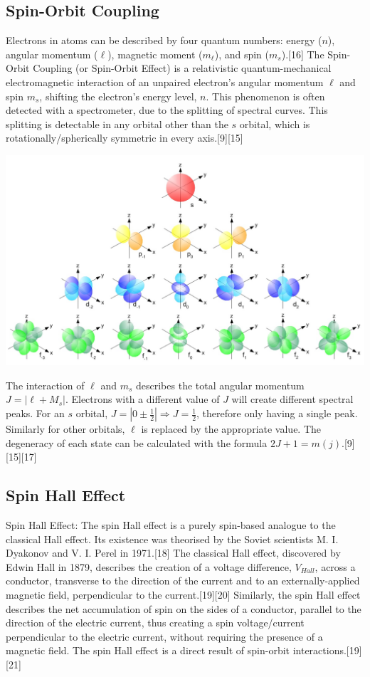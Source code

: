 \documentclass{article}
\begin{document}
\subsection{Spin-Orbit Coupling}
 Electrons in atoms can be described by four quantum numbers: energy ($n$), angular momentum ($\ell$), magnetic moment ($m_{\ell}$), and spin ($m_{s}$).[16] The Spin-Orbit Coupling (or Spin-Orbit Effect) is a relativistic quantum-mechanical electromagnetic interaction of an unpaired electron’s angular momentum $\ell$ and spin $m_{s}$, shifting the electron’s energy level, $n$. This phenomenon is often detected with a spectrometer, due to the splitting of spectral curves. This splitting is detectable in any orbital other than the $s$ orbital, which is rotationally/spherically symmetric in every axis.[9][15]

\begin{center}
    \includegraphics[scale=0.25]{K5EcA.jpg}
\end{center}

The interaction of $\ell$ and $m_{s}$ describes the total angular momentum $J = | \ell + M_{s} |$. Electrons with a different value of $J$ will create different spectral peaks. For an $s$ orbital, $J = | 0 \pm \frac{1}{2} | \Rightarrow J = \frac{1}{2}$, therefore only having a single peak. Similarly for other orbitals, $\ell$ is replaced by the appropriate value. The degeneracy of each state can be calculated with the formula $2J+1=m(j)$.[9][15][17]\\

\subsection{Spin Hall Effect}
Spin Hall Effect: The spin Hall effect is a purely spin-based analogue to the classical Hall effect. Its existence was theorised by the Soviet scientists M. I. Dyakonov and V. I. Perel in 1971.[18] The classical Hall effect, discovered by Edwin Hall in 1879, describes the creation of a voltage difference, $V_{Hall}$, across a conductor, transverse to the direction of the current and to an externally-applied magnetic field, perpendicular to the current.[19][20] Similarly, the spin Hall effect describes the net accumulation of spin on the sides of a conductor, parallel to the direction of the electric current, thus creating a spin voltage/current perpendicular to the electric current, without requiring the presence of a magnetic field. The spin Hall effect is a direct result of spin-orbit interactions.[19][21]
\end{document}
